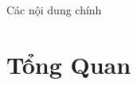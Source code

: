 \documentclass[11pt]{beamer}
\begin{document}
\begin{frame}
\titlepage
\end{frame}

\begin{frame}{Các nội dung chính}
\tableofcontents
\end{frame}

\section{Tổng Quan}



%


%


%


%

%


%


%







%














%
%
%
%
%
%
%
\end{document}
